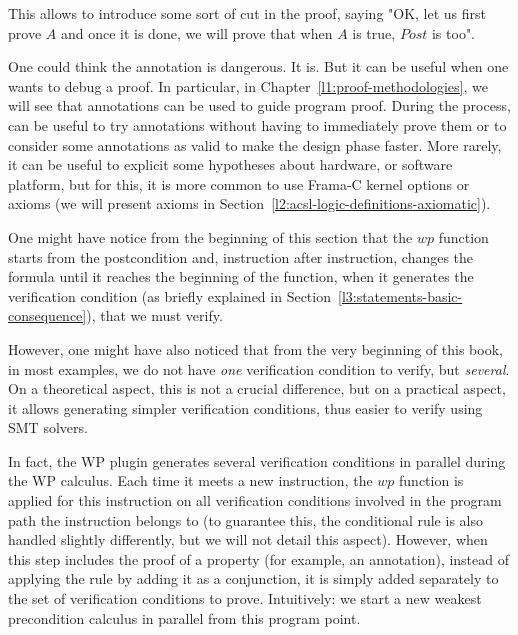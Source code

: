 This allows to introduce some sort of cut in the proof, saying "OK, let us first
prove $A$ and once it is done, we will prove that when $A$ is true, $Post$ is
too".


One could think the  annotation is dangerous. It is. But it
can be useful when one wants to debug a proof. In particular, in
Chapter~\ref{l1:proof-methodologies}, we will see that 
annotations can be used to guide program proof. During the process,
 can be useful to try annotations without having to
immediately prove them or to consider some annotations as valid to make the
design phase faster. More rarely, it can be useful to explicit some hypotheses
about hardware, or software platform, but for this, it is more common to use
Frama-C kernel options or axioms (we will present axioms in
Section~\ref{l2:acsl-logic-definitions-axiomatic}).




One might have notice from the beginning of this section that the $wp$ function
starts from the postcondition and, instruction after instruction, changes the
formula until it reaches the beginning of the function, when it generates the
verification condition (as briefly explained in
Section~\ref{l3:statements-basic-consequence}), that we must verify.


However, one might have also noticed that from the very beginning of this book,
in most examples, we do not have \emph{one} verification condition to verify,
but \emph{several}. On a theoretical aspect, this is not a crucial difference,
but on a practical aspect, it allows generating simpler verification conditions,
thus easier to verify using SMT solvers.


In fact, the WP plugin generates several verification conditions in parallel
during the WP calculus. Each time it meets a new instruction, the $wp$ function
is applied for this instruction on all verification conditions involved in the
program path the instruction belongs to (to guarantee this, the conditional
rule is also handled slightly differently, but we will not detail this aspect).
However, when this step includes the proof of a property (for example, an
 annotation), instead of applying the rule by adding it as a
conjunction, it is simply added separately to the set of verification conditions
to prove. Intuitively: we start a new weakest precondition calculus in parallel
from this program point.


